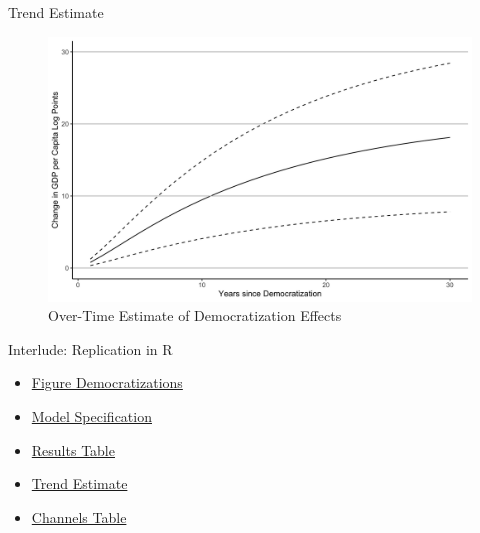 \documentclass[
  ignorenonframetext,
]{beamer}
\providecommand{\tightlist}{%
  \setlength{\itemsep}{0pt}\setlength{\parskip}{0pt}}\usepackage{longtable,booktabs,array}
\begin{document}
\begin{frame}{Trend Estimate}
\protect\hypertarget{trend-estimate}{}
\begin{figure}

{\centering \includegraphics{output/FigureTrend.png}

}

\caption{Over-Time Estimate of Democratization Effects}

\end{figure}
\end{frame}

\begin{frame}{Interlude: Replication in R}
\protect\hypertarget{interlude-replication-in-r}{}
\begin{itemize}
\tightlist
\item
  \href{https://skriptum.github.io/DDCG/vortrag/5-FigureDem.html}{Figure
  Democratizations}
\item
  \href{https://skriptum.github.io/DDCG/vortrag/2-Panel-Models.html}{Model
  Specification}
\item
  \href{https://skriptum.github.io/DDCG/vortrag/3-Table2.html}{Results
  Table}
\item
  \href{https://skriptum.github.io/DDCG/vortrag/4-Figure2.html\#plot}{Trend
  Estimate}
\item
  \href{https://skriptum.github.io/DDCG/vortrag/6-IVReg.html}{Channels
  Table}
\end{itemize}
\end{frame}
\end{document}
